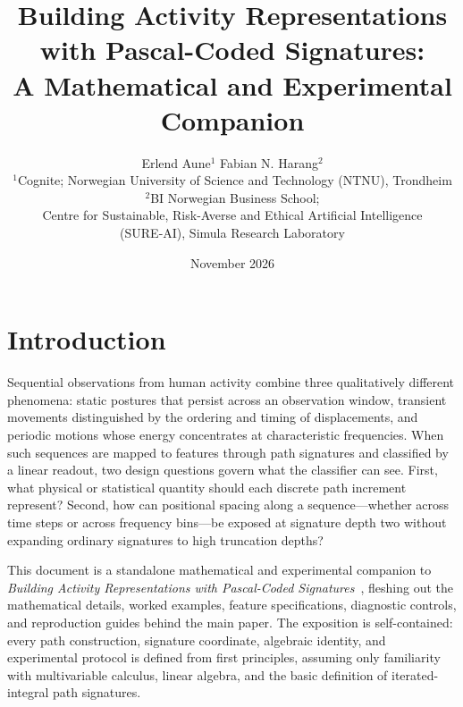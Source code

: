 \documentclass[10pt,a4paper]{article}
\title{Building Activity Representations with Pascal-Coded Signatures:\\[.3em]
\large A Mathematical and Experimental Companion}
\author{Erlend Aune$^{1}$ \quad Fabian N. Harang$^{2}$\\[.4em]
\small $^{1}$Cognite; Norwegian University of Science and Technology (NTNU), Trondheim\\
\small $^{2}$BI Norwegian Business School;\\
\small Centre for Sustainable, Risk-Averse and Ethical Artificial Intelligence\\
\small (SURE-AI), Simula Research Laboratory}
\date{November 2026}
\numberwithin{equation}{section}
\theoremstyle{plain}
\theoremstyle{definition}
\begin{document}
\maketitle

\section*{Introduction}

Sequential observations from human activity combine three qualitatively different
phenomena: static postures that persist across an observation window, transient
movements distinguished by the ordering and timing of displacements, and periodic
motions whose energy concentrates at characteristic frequencies. When such
sequences are mapped to features through path signatures and classified by a
linear readout, two design questions govern what the classifier can see. First,
what physical or statistical quantity should each discrete path increment
represent? Second, how can positional spacing along a sequence---whether across
time steps or across frequency bins---be exposed at signature depth two without
expanding ordinary signatures to high truncation depths?

This document is a standalone mathematical and experimental companion to
\emph{Building Activity Representations with Pascal-Coded
Signatures}~\cite{mainpaper}, fleshing out the mathematical details, worked
examples, feature specifications, diagnostic controls, and reproduction guides
behind the main paper. The exposition is self-contained: every path
construction, signature coordinate, algebraic identity, and experimental
protocol is defined from first principles, assuming only familiarity with
multivariable calculus, linear algebra, and the basic definition of
iterated-integral path signatures.
\end{document}
